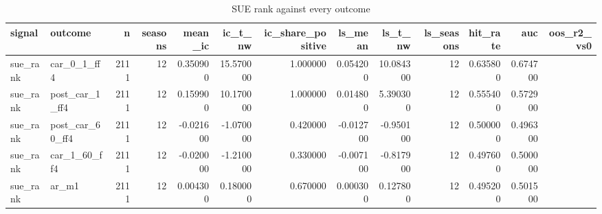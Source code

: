 \begin{table}
\caption{SUE rank against every outcome}
\label{tab:t7_surprise_benchmark__validation}
\begin{tabular}{llrrrrrrrrrrr}
\toprule
signal & outcome & n & seasons & mean\_ic & ic\_t\_nw & ic\_share\_positive & ls\_mean & ls\_t\_nw & ls\_seasons & hit\_rate & auc & oos\_r2\_vs0 \\
\midrule
sue\_rank & car\_0\_1\_ff4 & 2111 & 12 & 0.350900 & 15.570000 & 1.000000 & 0.054200 & 10.084300 & 12 & 0.635800 & 0.674700 &  \\
sue\_rank & post\_car\_1\_ff4 & 2111 & 12 & 0.159900 & 10.170000 & 1.000000 & 0.014800 & 5.390300 & 12 & 0.555400 & 0.572900 &  \\
sue\_rank & post\_car\_60\_ff4 & 2111 & 12 & -0.021600 & -1.070000 & 0.420000 & -0.012700 & -0.950100 & 12 & 0.500000 & 0.496300 &  \\
sue\_rank & car\_1\_60\_ff4 & 2111 & 12 & -0.020000 & -1.210000 & 0.330000 & -0.007100 & -0.817900 & 12 & 0.497600 & 0.500000 &  \\
sue\_rank & ar\_m1 & 2111 & 12 & 0.004300 & 0.180000 & 0.670000 & 0.000300 & 0.127800 & 12 & 0.495200 & 0.501500 &  \\
\bottomrule
\end{tabular}
\end{table}
